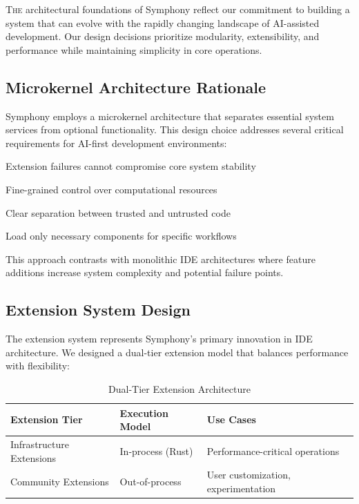 
\lettrine{T}{he} architectural foundations of Symphony reflect our commitment to building a system that can evolve with the rapidly changing landscape of AI-assisted development. Our design decisions prioritize modularity, extensibility, and performance while maintaining simplicity in core operations.

\subsection*{Microkernel Architecture Rationale}

Symphony employs a \textcolor{brandPrimary}{microkernel architecture} that separates essential system services from optional functionality. This design choice addresses several critical requirements for AI-first development environments:

\begin{description}[leftmargin=4cm,labelwidth=3.5cm]
    \item[\textbf{Fault Isolation}] Extension failures cannot compromise core system stability
    \item[\textbf{Resource Management}] Fine-grained control over computational resources
    \item[\textbf{Security Boundaries}] Clear separation between trusted and untrusted code
    \item[\textbf{Performance Optimization}] Load only necessary components for specific workflows
\end{description}

This approach contrasts with monolithic IDE architectures where feature additions increase system complexity and potential failure points.

\subsection*{Extension System Design}

The extension system represents Symphony's primary innovation in IDE architecture. We designed a \textcolor{brandSecondary}{dual-tier extension model} that balances performance with flexibility:

\begin{table}[ht]
\centering
\begin{tabular}{@{}lll@{}}
\toprule
\textbf{Extension Tier} & \textbf{Execution Model} & \textbf{Use Cases} \\
\midrule
Infrastructure Extensions & In-process (Rust) & Performance-critical operations \\
Community Extensions & Out-of-process & User customization, experimentation \\
\bottomrule
\end{tabular}
\caption{Dual-Tier Extension Architecture}
\end{table}

